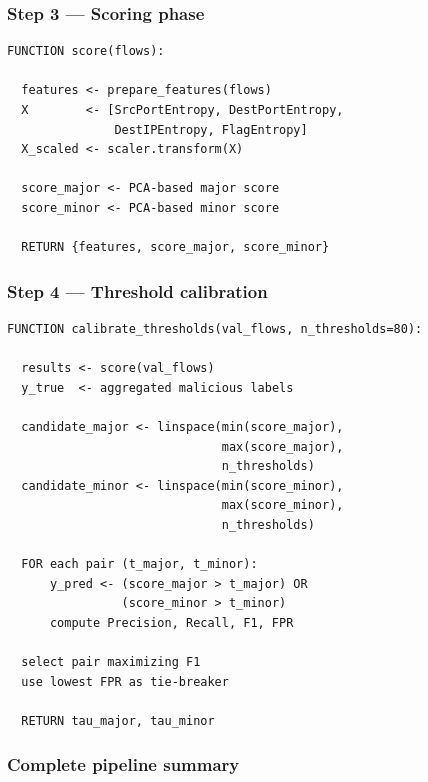 \documentclass{article}
\begin{document}
\subsubsection*{Step 3 --- Scoring phase}

\begin{lstlisting}[caption={Major/minor anomaly scoring}]
FUNCTION score(flows):

  features <- prepare_features(flows)
  X        <- [SrcPortEntropy, DestPortEntropy,
               DestIPEntropy, FlagEntropy]
  X_scaled <- scaler.transform(X)

  score_major <- PCA-based major score
  score_minor <- PCA-based minor score

  RETURN {features, score_major, score_minor}
\end{lstlisting}

\subsubsection*{Step 4 --- Threshold calibration}

\begin{lstlisting}[caption={Two-dimensional threshold calibration}]
FUNCTION calibrate_thresholds(val_flows, n_thresholds=80):

  results <- score(val_flows)
  y_true  <- aggregated malicious labels

  candidate_major <- linspace(min(score_major),
                              max(score_major),
                              n_thresholds)
  candidate_minor <- linspace(min(score_minor),
                              max(score_minor),
                              n_thresholds)

  FOR each pair (t_major, t_minor):
      y_pred <- (score_major > t_major) OR
                (score_minor > t_minor)
      compute Precision, Recall, F1, FPR

  select pair maximizing F1
  use lowest FPR as tie-breaker

  RETURN tau_major, tau_minor
\end{lstlisting}

\subsubsection*{Complete pipeline summary}
\end{document}
